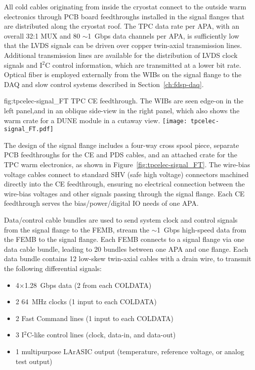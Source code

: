All cold cables originating from inside the cryostat connect to the outside warm electronics through PCB board feedthroughs
installed in the signal flanges that are distributed along the cryostat roof.
The TPC data rate per APA, with an overall 32:1 MUX and 80 $\sim$1~Gbps data channels per APA,
is sufficiently low that the LVDS signals can be driven over copper twin-axial transmission lines.
Additional transmission lines are available for the distribution of LVDS clock signals and I$^2$C control information,
which are transmitted at a lower bit rate.
Optical fiber is employed externally from the WIBs on the signal flange to the DAQ and slow control systems described in Section~\ref{ch:fdsp-daq}.

\begin{dunefigure}
{fig:tpcelec-signal_FT}
{TPC CE feedthrough. The WIBs are seen edge-on in the left panel,and in an oblique side-view in the right panel, which also shows the warm crate for a DUNE module in a cutaway view.}
\texttt{[image: tpcelec-signal\_FT.pdf]}
\end{dunefigure}

The design of the signal flange includes a four-way cross spool piece, separate PCB feedthroughs for the CE and PDS cables, and
an attached crate for the TPC warm electronics, as shown in Figure~\ref{fig:tpcelec-signal_FT}.
The wire-bias voltage cables connect to standard SHV (safe high voltage) connectors machined directly into the CE feedthrough,
ensuring no electrical connection between the wire-bias voltages and other signals passing through the signal flange.
Each CE feedthrough serves the bias/power/digital IO needs of one APA.  

Data/control cable bundles are used to send system clock and control signals from the 
signal flange to the FEMB, stream the $\sim$1~Gbps high-speed data from the FEMB to the signal flange.  Each FEMB 
connects to a signal flange via one data cable bundle, leading to 20 bundles between one APA and one flange.  Each data bundle contains 12 low-skew twin-axial cables with a drain wire, 
to transmit the following differential signals:

\begin{itemize}
    \item 4$\times$1.28~Gbps data (2 from each COLDATA)
    \item 2 64~MHz clocks (1 input to each COLDATA)
    \item 2 Fast Command lines (1 input to each COLDATA)
    \item 3 I$^2$C-like control lines (clock, data-in, and data-out)
    \item 1 multipurpose LArASIC output (temperature, reference voltage, or analog test output)
\end{itemize}

